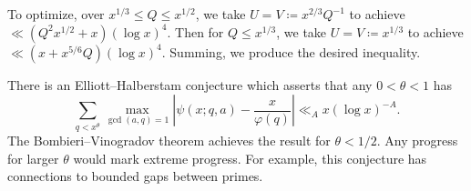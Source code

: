 \documentclass[../notes.tex]{subfiles}
\begin{document}
To optimize, over $x^{1/3}\le Q\le x^{1/2}$, we take $U=V\coloneqq x^{2/3}Q^{-1}$ to achieve $\ll\left(Q^2x^{1/2}+x\right)(\log x)^4$. Then for $Q\le x^{1/3}$, we take $U=V\coloneqq x^{1/3}$ to achieve $\ll\left(x+x^{5/6}Q\right)(\log x)^4$. Summing, we produce the desired inequality.
\begin{remark}
	There is an Elliott--Halberstam conjecture which asserts that any $0<\theta<1$ has
	\[\sum_{q<x^\theta}\max_{\gcd(a,q)=1}\left|\psi(x;q,a)-\frac x{\varphi(q)}\right|\ll_A x(\log x)^{-A}.\]
	The Bombieri--Vinogradov theorem achieves the result for $\theta<1/2$. Any progress for larger $\theta$ would mark extreme progress. For example, this conjecture has connections to bounded gaps between primes.
\end{remark}
\end{document}
